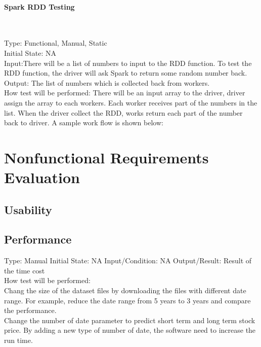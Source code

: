 \documentclass[12pt, titlepage]{article}
\begin{document}
\paragraph{ Spark RDD Testing}
~\newline



Type: Functional, Manual, Static\\
Initial State: NA\\
Input:There will be a list of numbers to input to the RDD function. To test the RDD function, the driver will ask Spark to return some random number back. \\
Output: The list of numbers which is collected back from workers.\\
How test will be performed: There will be an input array to the driver, driver assign the array to each workers. Each worker receives part of the numbers in the list. When the driver collect the RDD, works return each part of the number back to driver. A sample work flow is shown below:
~\newline




\section{Nonfunctional Requirements Evaluation}

\subsection{Usability}
		
\subsection{Performance}
Type: Manual
Initial State: NA
Input/Condition: NA
Output/Result: Result of the time cost\\
How test will be performed: \\
Chang the size of the dataset files by downloading the files with different date range. For example, reduce the date range from 5 years to 3 years and compare the performance. \\
Change the number of date parameter to predict short term and long term stock price. By adding a new type of number of date, the software need to increase the run time. \\
\end{document}
